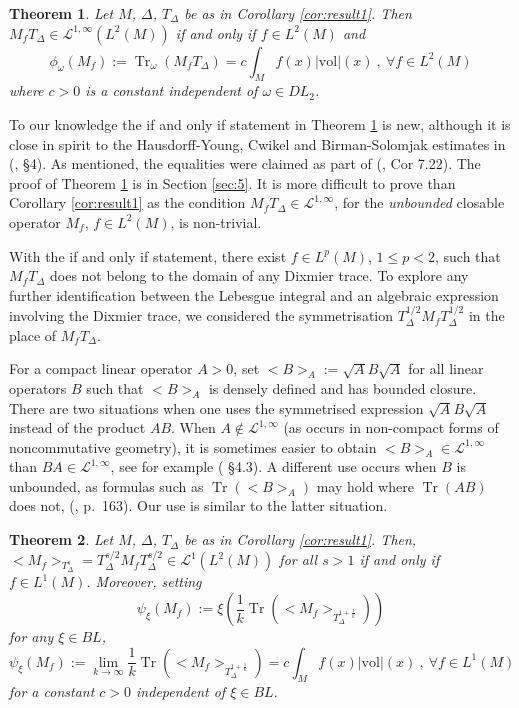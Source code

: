 \documentclass[final,1p]{elsarticle}
\numberwithin{equation}{section}
\theoremstyle{plain}
\newtheorem{thm}{Theorem}[section]
\theoremstyle{definition}
\begin{document}
\begin{thm} \label{thm:result2}
Let $M$, $\Delta$, $T_\Delta$ be as in Corollary \ref{cor:result1}.  Then
$M_f T_\Delta \in \mathcal{L}^{1,\infty}(L^2(M))$ if and only if $f \in L^2(M)$ and 
$$
\phi_{\omega}(M_f) := \operatorname{Tr}_{\omega}(M_f T_\Delta) = c \int_{M} f(x) |\mathrm{vol}|(x) \ , \ {\ensuremath{\forall}} f \in L^2(M)
$$
where $c > 0$ is a constant independent of $\omega \in DL_2$.
\end{thm}

To our knowledge the if and only if statement in Theorem \ref{thm:result2} is new, although it is close
in spirit to the Hausdorff-Young, Cwikel and Birman-Solomjak estimates in (\cite{S}, \S 4).  As mentioned, the equalities were claimed as part of (\cite{GBVF}, Cor 7.22).
The proof of Theorem \ref{thm:result2} is in Section \ref{sec:5}.  It is more difficult to prove than Corollary \ref{cor:result1} as the condition $M_f T_\Delta \in \mathcal{L}^{1,\infty}$, for the \emph{unbounded} closable operator $M_f$, $f \in L^2(M)$, is non-trivial.  

With the if and only if statement, there exist
$f \in L^p(M)$, $1 \leq p < 2$, such that $M_fT_\Delta$
does not belong to the domain of any Dixmier trace.  To explore
any further identification between the Lebesgue integral
and an algebraic expression involving the Dixmier trace,
we considered the symmetrisation $T_\Delta^{1/2}M_fT_\Delta^{1/2}$ in the place of $M_fT_\Delta$.

For a compact linear operator $A > 0$, set
${\ensuremath{\big< {B} \big>_{{A}}}} := \sqrt{A}B\sqrt{A}$ for all linear operators $B$ such that ${\ensuremath{\big< {B} \big>_{{A}}}}$ is densely defined and has bounded closure.  There are two situations when one uses the symmetrised expression $\sqrt{A}B\sqrt{A}$ instead of the product $AB$.  When $A \notin \mathcal{L}^{1,\infty}$
(as occurs in non-compact forms of noncommutative geometry), it is sometimes easier to obtain ${\ensuremath{\big< {B} \big>_{{A}}}} \in \mathcal{L}^{1,\infty}$ than $BA \in \mathcal{L}^{1,\infty}$, see for example 
(\cite{GIV} \S 4.3).  A different use occurs when $B$ is unbounded, as
formulas such as $\operatorname{Tr}({\ensuremath{\big< {B} \big>_{{A}}}})$ may hold where $\operatorname{Tr}(AB)$ does not,
(\cite{Bik}, p.~163).  Our use is similar to the latter situation.

\begin{thm} \label{thm:1b2} Let $M$, $\Delta$, $T_\Delta$ be as in Corollary \ref{cor:result1}.  Then, ${\ensuremath{\big< {M_f} \big>_{{T_{\Delta}^s}}}} = T_\Delta^{s/2} M_f T_\Delta^{s/2} \in \mathcal{L}^{1}(L^2(M))$ for all $s > 1$
if and only if $f \in L^1(M)$.  Moreover, setting
$$
\psi_{\ensuremath{\xi}}(M_f) := {\ensuremath{\xi}} \left( \frac{1}{k} \operatorname{Tr}({\ensuremath{\big< {M_f} \big>_{{T_{\Delta}^{1+\frac{1}{k}}}}}}) \right)
$$
for any ${\ensuremath{\xi}} \in BL$,
$$
\psi_{\ensuremath{\xi}}(M_f) := \lim_{k \to \infty} \frac{1}{k}
\operatorname{Tr}({\ensuremath{\big< {M_f} \big>_{{T_{\Delta}^{1+\frac{1}{k}}}}}}) = c \int_{M} f(x) |\mathrm{vol}|(x) \ , \ {\ensuremath{\forall}} f \in L^1(M)
$$
for a constant $c > 0$ independent of ${\ensuremath{\xi}} \in BL$.
\end{thm}
\end{document}
